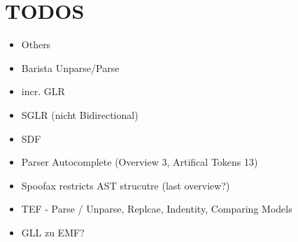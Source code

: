 \chapter{TODOS}
\begin{itemize}
	\item Others
	\item Barista \- Unparse/Parse
	\item incr. GLR
	\item SGLR (nicht Bidirectional)
	\item SDF
	\item Parser Autocomplete (Overview 3, Artifical Tokens 13)
	\item Spoofax restricts AST strucutre (last overview?)
	\item TEF  - Parse / Unparse, Replcae, Indentity, Comparing Models
	\item GLL zu EMF?
\end{itemize}